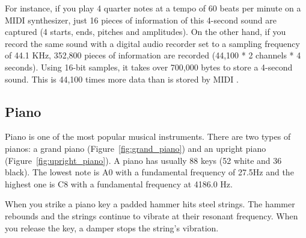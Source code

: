 \documentclass[11pt]{article} %
\begin{document}
For instance, if you play 4 quarter notes at a tempo of 60 beats per minute on a MIDI synthesizer, just 16 pieces of information of this 4-second sound are captured (4 starts, ends, pitches and amplitudes). On the other hand, if you record the same sound with a digital audio recorder set to a sampling frequency of 44.1 KHz, 352,800 pieces of information are recorded (44,100 * 2 channels * 4 seconds). Using 16-bit samples, it takes over 700,000 bytes to store a 4-second sound. This is 44,100 times more data than is stored by MIDI \citep*{Roads1996}. 

\subsection{Piano}
Piano is one of the most popular musical instruments. There are two types of pianos: a grand piano (Figure~\ref{fig:grand_piano}) and an upright piano (Figure~\ref{fig:upright_piano}). A piano has usually 88 keys (52 white and 36 black). The lowest note is A0 with a fundamental frequency of 27.5Hz and the highest one is C8 with a fundamental frequency at 4186.0 Hz. 

When you strike a piano key a padded hammer hits steel strings. The hammer rebounds and the strings continue to vibrate at their resonant frequency. When you release the key, a damper stops the string's vibration. 
\end{document}
